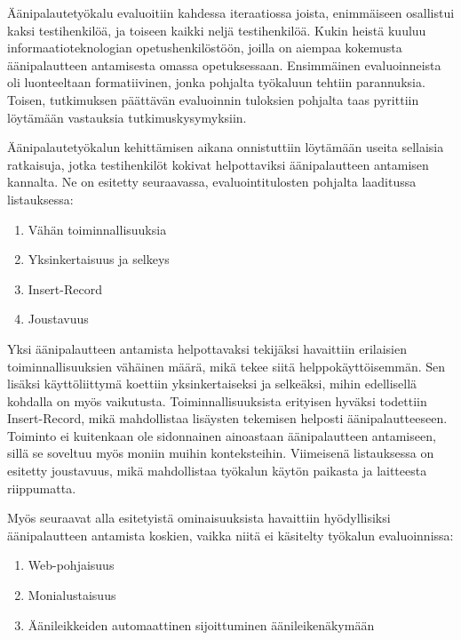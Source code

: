 \documentclass[utf8]{gradu3}
\begin{document}
Äänipalautetyökalu evaluoitiin kahdessa iteraatiossa joista, enimmäiseen osallistui kaksi testihenkilöä, ja toiseen kaikki neljä testihenkilöä. Kukin heistä kuuluu informaatioteknologian opetushenkilöstöön, joilla on aiempaa kokemusta äänipalautteen antamisesta omassa opetuksessaan. Ensimmäinen evaluoinneista oli luonteeltaan formatiivinen, jonka pohjalta työkaluun tehtiin parannuksia. Toisen, tutkimuksen päättävän evaluoinnin tuloksien pohjalta taas pyrittiin löytämään vastauksia tutkimuskysymyksiin.

Äänipalautetyökalun kehittämisen aikana onnistuttiin löytämään useita sellaisia ratkaisuja, jotka testihenkilöt kokivat helpottaviksi äänipalautteen antamisen kannalta. Ne on esitetty seuraavassa, evaluointitulosten pohjalta laaditussa listauksessa:

\begin{enumerate}
  \item Vähän toiminnallisuuksia
  \item Yksinkertaisuus ja selkeys
  \item Insert-Record
  \item Joustavuus
\end{enumerate}

Yksi äänipalautteen antamista helpottavaksi tekijäksi havaittiin erilaisien toiminnallisuuksien vähäinen määrä, mikä tekee siitä helppokäyttöisemmän. Sen lisäksi käyttöliittymä koettiin yksinkertaiseksi ja selkeäksi, mihin edellisellä kohdalla on myös vaikutusta. Toiminnallisuuksista erityisen hyväksi todettiin Insert-Record, mikä mahdollistaa lisäysten tekemisen helposti äänipalautteeseen. Toiminto ei kuitenkaan ole sidonnainen ainoastaan äänipalautteen antamiseen, sillä se soveltuu myös moniin muihin konteksteihin. Viimeisenä listauksessa on esitetty joustavuus, mikä mahdollistaa työkalun käytön paikasta ja laitteesta riippumatta. 

Myös seuraavat alla esitetyistä ominaisuuksista havaittiin hyödyllisiksi äänipalautteen antamista koskien, vaikka niitä ei käsitelty työkalun evaluoinnissa:

\begin{enumerate}
  \item Web-pohjaisuus
  \item Monialustaisuus
  \item Äänileikkeiden automaattinen sijoittuminen äänileikenäkymään
\end{enumerate}
\end{document}

